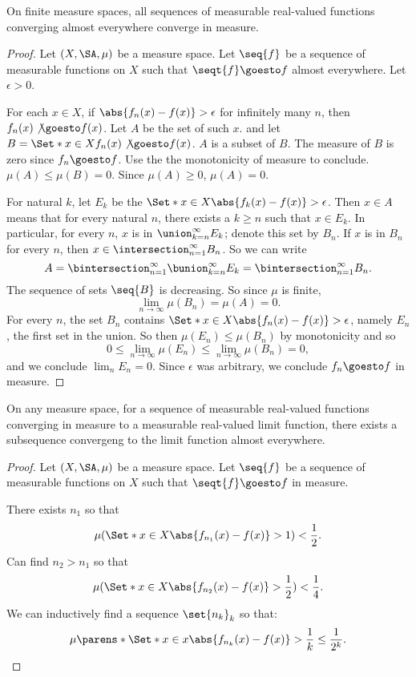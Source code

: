 \begin{prop}
On finite measure spaces,
all sequences of measurable
real-valued functions
converging almost
everywhere converge in
measure.

\begin{proof}

Let $(X, \SA, \mu)$
be a measure space.
Let $\seq{f}$ be a sequence
of measurable functions on $X$
such that $\seqt{f} \goesto f$
almost everywhere.
Let $\epsilon > 0$.

For each $x \in X$, if
$\abs{f_n(x) - f(x)} > \epsilon$
for infinitely many $n$,
then $f_n(x) \not\goesto f(x)$.
Let $A$ be the set of such $x$.
and let $B =
\Set*{
x \in X
}{
f_n(x) \not\goesto f(x)
}$.
$A$ is a subset
of $B$.
The measure of $B$
is zero
since $f_n \goesto f$.
Use the the monotonicity
of measure to conclude.
$\mu(A) \leq \mu(B) = 0$.
Since $\mu(A) \geq 0$,
$\mu(A) = 0$.

For natural
$k$, let $E_k$
be the
$\Set*{x \in X}
{\abs{f_k(x) - f(x)} > \epsilon}$.
Then $x \in A$ means that
for every natural $n$, there exists
a $k \geq n$ such that $x \in E_k$.
In particular, for every $n$,
$x$ is in $\union_{k = n}^{\infty}E_k$;
denote this set by $B_n$.
If $x$ is in $B_n$ for every
$n$, then
$x \in \intersection_{n = 1}^{\infty} B_n$.
So we can write
\[
  A = \bintersection_{n = 1}^{\infty}
  \bunion_{k = n}^{\infty}
  E_k
  = \bintersection_{n = 1}^{\infty}
  B_n
  .
\]
The sequence of sets $\seq{B}$
is decreasing. So since $\mu$ is finite,
\[
  \lim_{n \to \infty} \mu(B_n) = \mu(A) = 0.
\]
For every $n$, the set $B_n$ contains
$\Set*{x \in X}{\abs{f_n(x) - f(x)} >
\epsilon}$,
namely $E_n$, the first
set in the union.
So then $\mu(E_n) \leq \mu(B_n)$
by monotonicity and so
\[
  0
  \leq \lim_{n \to \infty} \mu(E_n)
  \leq \lim_{n \to \infty} \mu(B_n)
  = 0,
\]
and we conclude $\lim_{n} E_n = 0$.
Since $\epsilon$ was arbitrary,
we conclude $f_n \goesto f$ in
measure.

\end{proof}

\end{prop}

\begin{prop}
  On any measure space,
  for a sequence
  of measurable real-valued
  functions converging
  in measure to a measurable
  real-valued limit function,
  there exists a subsequence
  convergeng to the limit
  function almost everywhere.

  \begin{proof}
Let $(X, \SA, \mu)$
be a measure space.
Let $\seq{f}$ be a sequence
of measurable functions on $X$
such that $\seqt{f} \goesto f$
in measure.

There exists $n_1$
so that
    \[
      \mu(\Set*{x \in X}{\abs{f_{n_1}(x) - f(x)} > 1}) < \frac{1}{2}.
    \]
    Can find $n_2 > n_1$ so that
    \[
      \mu(\Set*{x \in X}{\abs{f_{n_2}(x) - f(x)} > \frac{1}{2}}) < \frac{1}{4}.
    \]
    We can inductively find
    a sequence
    $\set{n_k}_k$
    so that:
    \[
      \mu\parens*{\Set*{
        x \in x
      }{
        \abs{f_{n_k}(x) - f(x)} > \frac{1}{k}
      }} \leq \frac{1}{2^k}.
    \]
  \end{proof}
\end{prop}


\strats
